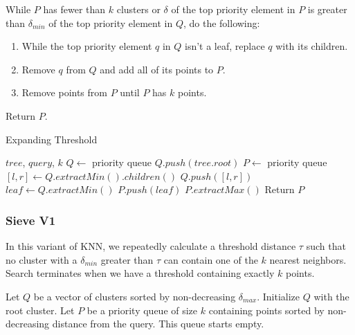 While $P$ has fewer than $k$ clusters or $\delta$ of the top priority element in $P$ is greater 
than $\delta_{min}$ of the top priority element in $Q$, do the following:
\begin{enumerate}
\item While the top priority element $q$ in $Q$ isn't a leaf, replace $q$ with its children.
\item Remove $q$ from $Q$ and add all of its points to $P$. 
\item Remove points from $P$ until $P$ has $k$ points. 
\end{enumerate}

Return $P$. 


\begin{algorithm} %
\caption{Expanding Threshold} %
\label{alg:expanding_threshold} %
\begin{algorithmic}[1] %
    \REQUIRE $tree$, $query$, $k$
    \STATE $Q \leftarrow$ priority queue
    \STATE $Q.push(tree.root)$
    \STATE $P \leftarrow$ priority queue
            \STATE $[l, r] \leftarrow Q.extractMin().children()$
            \STATE $Q.push([l, r])$
        \ENDWHILE
        \STATE $leaf \leftarrow Q.extractMin()$
        \STATE $P.push(leaf)$
            \STATE $P.extractMax()$
        \ENDWHILE
    \ENDWHILE
    \STATE Return $P$
\end{algorithmic}
\end{algorithm}


\subsubsection{Sieve V1}
\label{subsubsec:methods:knn-search:sieve-v1}

In this variant of KNN, we repeatedly calculate a threshold distance $\tau$ such that no cluster with a $\delta_{min}$ greater than $\tau$ 
can contain one of the $k$ nearest neighbors. Search terminates when we have a threshold containing exactly $k$ points.

Let $Q$ be a vector of clusters sorted by non-decreasing $\delta_{max}$. Initialize $Q$ with  
the root cluster. 
Let $P$ be a priority queue of size $k$ containing points sorted by non-decreasing distance from the query. This queue starts empty.


